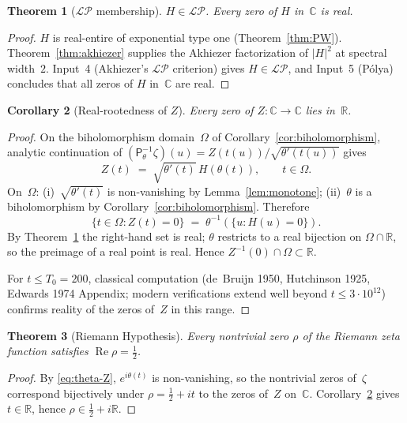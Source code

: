 \documentclass[11pt,a4paper]{article}
\newtheorem{theorem}{Theorem}[section]
\newtheorem{corollary}[theorem]{Corollary}
\theoremstyle{definition}
\DeclareMathOperator{\Real}{Re}
\newcommand{\ipp}{\mathsf{P}_\theta^{-1}}
\newcommand{\C}{\mathbb{C}}
\newcommand{\R}{\mathbb{R}}
\newcommand{\LP}{\mathcal{LP}}
\begin{document}
\begin{theorem}[$\LP$ membership]\label{thm:LP}
$H\in\LP$. Every zero of $H$ in~$\C$ is real.
\end{theorem}

\begin{proof}
$H$ is real-entire of exponential type one (Theorem~\ref{thm:PW}).
Theorem~\ref{thm:akhiezer} supplies the Akhiezer factorization of $|H|^2$ at
spectral width~$2$. Input~4 (Akhiezer's $\LP$ criterion) gives $H\in\LP$, and
Input~5 (P\'olya) concludes that all zeros of $H$ in~$\C$ are real.
\end{proof}

\begin{corollary}[Real-rootedness of $Z$]\label{cor:Z}
Every zero of $Z\colon\C\to\C$ lies in~$\R$.
\end{corollary}

\begin{proof}
On the biholomorphism domain~$\Omega$ of Corollary~\ref{cor:biholomorphism},
analytic continuation of $(\ipp\zeta)(u) = Z(t(u))/\sqrt{\theta'(t(u))}$ gives
\begin{equation}
  Z(t) \;=\; \sqrt{\theta'(t)}\,H(\theta(t)), \qquad t\in\Omega.
  \label{eq:pullback-identity}
\end{equation}
On~$\Omega$: (i)~$\sqrt{\theta'(t)}$ is non-vanishing by Lemma~\ref{lem:monotone};
(ii)~$\theta$ is a biholomorphism by Corollary~\ref{cor:biholomorphism}. Therefore
\[
  \{t\in\Omega\colon Z(t)=0\} \;=\; \theta^{-1}(\{u\colon H(u)=0\}).
\]
By Theorem~\ref{thm:LP} the right-hand set is real; $\theta$ restricts to a real
bijection on $\Omega\cap\R$, so the preimage of a real point is real. Hence
$Z^{-1}(0)\cap\Omega\subset\R$.

For $t\le T_0 = 200$, classical computation (de~Bruijn 1950, Hutchinson 1925,
Edwards 1974 Appendix; modern verifications extend well beyond
$t\le 3\cdot 10^{12}$) confirms reality of the zeros of~$Z$ in this range.
\end{proof}

\begin{theorem}[Riemann Hypothesis]\label{thm:RH}
Every nontrivial zero $\rho$ of the Riemann zeta function satisfies
$\Real\rho = \tfrac12$.
\end{theorem}

\begin{proof}
By \eqref{eq:theta-Z}, $e^{i\theta(t)}$ is non-vanishing, so the nontrivial zeros
of~$\zeta$ correspond bijectively under $\rho = \tfrac12+it$ to the zeros of~$Z$
on~$\C$. Corollary~\ref{cor:Z} gives $t\in\R$, hence
$\rho\in\tfrac12+i\R$.
\end{proof}
\end{document}
